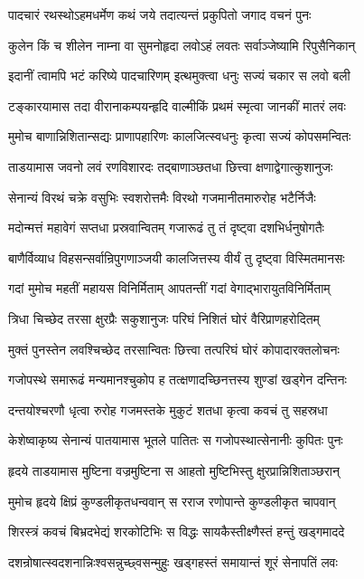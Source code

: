 \twolineshloka
{पादचारं रथस्थोऽहमधर्मेण कथं जये}
{तदात्यन्तं प्रकुपितो जगाद वचनं पुनः}%

\twolineshloka
{कुलेन किं च शीलेन नाम्ना वा सुमनोहृदा}
{लवोऽहं लवतः सर्वाञ्जेष्यामि रिपुसैनिकान्}%

\twolineshloka
{इदानीं त्वामपि भटं करिष्ये पादचारिणम्}
{इत्थमुक्त्वा धनुः सज्यं चकार स लवो बली}%

\twolineshloka
{टङ्कारयामास तदा वीरानाकम्पयन्हृदि}
{वाल्मीकिं प्रथमं स्मृत्वा जानकीं मातरं लवः}%

\twolineshloka
{मुमोच बाणान्निशितान्सद्यः प्राणापहारिणः}
{कालजित्स्वधनुः कृत्वा सज्यं कोपसमन्वितः}%

\twolineshloka
{ताडयामास जवनो लवं रणविशारदः}
{तद्बाणाञ्छतधा छित्त्वा क्षणाद्वेगात्कुशानुजः}%

\twolineshloka
{सेनान्यं विरथं चक्रे वसुभिः स्वशरोत्तमैः}
{विरथो गजमानीतमारुरोह भटैर्निजैः}%

\twolineshloka
{मदोन्मत्तं महावेगं सप्तधा प्रस्रवान्वितम्}
{गजारूढं तु तं दृष्ट्वा दशभिर्धनुषोगतैः}%

\twolineshloka
{बाणैर्विव्याध विहसन्सर्वान्रिपुगणाञ्जयी}
{कालजित्तस्य वीर्यं तु दृष्ट्वा विस्मितमानसः}%

\twolineshloka
{गदां मुमोच महतीं महायस विनिर्मिताम्}
{आपतन्तीं गदां वेगाद्भारायुतविनिर्मिताम्}%

\twolineshloka
{त्रिधा चिच्छेद तरसा क्षुरप्रैः सकुशानुजः}
{परिघं निशितं घोरं वैरिप्राणहरोदितम्}%

\twolineshloka
{मुक्तं पुनस्तेन लवश्चिच्छेद तरसान्वितः}
{छित्त्वा तत्परिघं घोरं कोपादारक्तलोचनः}%

\twolineshloka
{गजोपस्थे समारूढं मन्यमानश्चुकोप ह}
{तत्क्षणादच्छिनत्तस्य शुण्डां खड्गेन दन्तिनः}%

\twolineshloka
{दन्तयोश्चरणौ धृत्वा रुरोह गजमस्तके}
{मुकुटं शतधा कृत्वा कवचं तु सहस्रधा}%

\twolineshloka
{केशेष्वाकृष्य सेनान्यं पातयामास भूतले}
{पातितः स गजोपस्थात्सेनानीः कुपितः पुनः}%

\twolineshloka
{हृदये ताडयामास मुष्टिना वज्रमुष्टिना}
{स आहतो मुष्टिभिस्तु क्षुरप्रान्निशिताञ्छरान्}%

\twolineshloka
{मुमोच हृदये क्षिप्रं कुण्डलीकृतधन्ववान्}
{स रराज रणोपान्ते कुण्डलीकृत चापवान्}%

\twolineshloka
{शिरस्त्रं कवचं बिभ्रदभेद्यं शरकोटिभिः}
{स विद्धः सायकैस्तीक्ष्णैस्तं हन्तुं खड्गमाददे}%

\twolineshloka
{दशन्रोषात्स्वदशनान्निःश्वसन्नुच्छ्वसन्मुहुः}
{खड्गहस्तं समायान्तं शूरं सेनापतिं लवः}%

